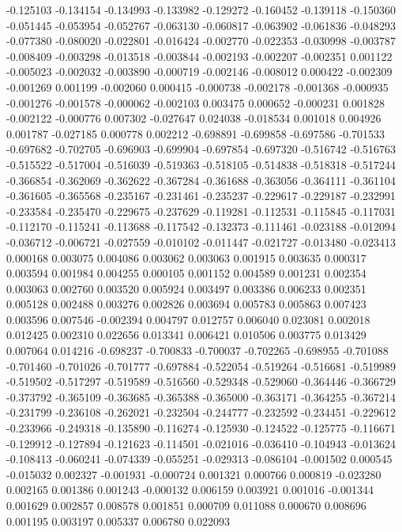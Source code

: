 -0.125103
-0.134154
-0.134993
-0.133982
-0.129272
-0.160452
-0.139118
-0.150360
-0.051445
-0.053954
-0.052767
-0.063130
-0.060817
-0.063902
-0.061836
-0.048293
-0.077380
-0.080020
-0.022801
-0.016424
-0.002770
-0.022353
-0.030998
-0.003787
-0.008409
-0.003298
-0.013518
-0.003844
-0.002193
-0.002207
-0.002351
0.001122
-0.005023
-0.002032
-0.003890
-0.000719
-0.002146
-0.008012
0.000422
-0.002309
-0.001269
0.001199
-0.002060
0.000415
-0.000738
-0.002178
-0.001368
-0.000935
-0.001276
-0.001578
-0.000062
-0.002103
0.003475
0.000652
-0.000231
0.001828
-0.002122
-0.000776
0.007302
-0.027647
0.024038
-0.018534
0.001018
0.004926
0.001787
-0.027185
0.000778
0.002212
-0.698891
-0.699858
-0.697586
-0.701533
-0.697682
-0.702705
-0.696903
-0.699904
-0.697854
-0.697320
-0.516742
-0.516763
-0.515522
-0.517004
-0.516039
-0.519363
-0.518105
-0.514838
-0.518318
-0.517244
-0.366854
-0.362069
-0.362622
-0.367284
-0.361688
-0.363056
-0.364111
-0.361104
-0.361605
-0.365568
-0.235167
-0.231461
-0.235237
-0.229617
-0.229187
-0.232991
-0.233584
-0.235470
-0.229675
-0.237629
-0.119281
-0.112531
-0.115845
-0.117031
-0.112170
-0.115241
-0.113688
-0.117542
-0.132373
-0.111461
-0.023188
-0.012094
-0.036712
-0.006721
-0.027559
-0.010102
-0.011447
-0.021727
-0.013480
-0.023413
0.000168
0.003075
0.004086
0.003062
0.003063
0.001915
0.003635
0.000317
0.003594
0.001984
0.004255
0.000105
0.001152
0.004589
0.001231
0.002354
0.003063
0.002760
0.003520
0.005924
0.003497
0.003386
0.006233
0.002351
0.005128
0.002488
0.003276
0.002826
0.003694
0.005783
0.005863
0.007423
0.003596
0.007546
-0.002394
0.004797
0.012757
0.006040
0.023081
0.002018
0.012425
0.002310
0.022656
0.013341
0.006421
0.010506
0.003775
0.013429
0.007064
0.014216
-0.698237
-0.700833
-0.700037
-0.702265
-0.698955
-0.701088
-0.701460
-0.701026
-0.701777
-0.697884
-0.522054
-0.519264
-0.516681
-0.519989
-0.519502
-0.517297
-0.519589
-0.516560
-0.529348
-0.529060
-0.364446
-0.366729
-0.373792
-0.365109
-0.363685
-0.365388
-0.365000
-0.363171
-0.364255
-0.367214
-0.231799
-0.236108
-0.262021
-0.232504
-0.244777
-0.232592
-0.234451
-0.229612
-0.233966
-0.249318
-0.135890
-0.116274
-0.125930
-0.124522
-0.125775
-0.116671
-0.129912
-0.127894
-0.121623
-0.114501
-0.021016
-0.036410
-0.104943
-0.013624
-0.108413
-0.060241
-0.074339
-0.055251
-0.029313
-0.086104
-0.001502
0.000545
-0.015032
0.002327
-0.001931
-0.000724
0.001321
0.000766
0.000819
-0.023280
0.002165
0.001386
0.001243
-0.000132
0.006159
0.003921
0.001016
-0.001344
0.001629
0.002857
0.008578
0.001851
0.000709
0.011088
0.000670
0.008696
0.001195
0.003197
0.005337
0.006780
0.022093
